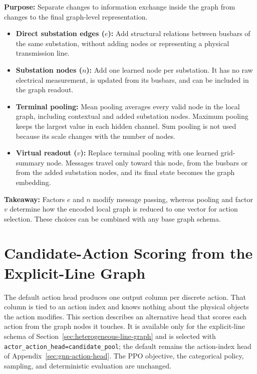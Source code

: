\begin{tcolorbox}[
  colframe=red!75!black,
  colback=red!5!white,
  title=Chapter Summary (2/3): Augmentations and Graph Readout
]
\textbf{Purpose:} Separate changes to information exchange inside the graph
from changes to the final graph-level representation.

\begin{itemize}
  \item \textbf{Direct substation edges ($e$):} Add structural relations between
  busbars of the same substation, without adding nodes or representing a
  physical transmission line.
  \item \textbf{Substation nodes ($n$):} Add one learned node per substation.
  It has no raw electrical measurement, is updated from its busbars, and can be
  included in the graph readout.
  \item \textbf{Terminal pooling:} Mean pooling averages every valid node in the
  local graph, including contextual and added substation nodes. Maximum pooling
  keeps the largest value in each hidden channel. Sum pooling is not used
  because its scale changes with the number of nodes.
  \item \textbf{Virtual readout ($v$):} Replace terminal pooling with one learned
  grid-summary node. Messages travel only toward this node, from the busbars or
  from the added substation nodes, and its final state becomes the graph
  embedding.
\end{itemize}

\textbf{Takeaway:} Factors $e$ and $n$ modify message passing, whereas pooling
and factor $v$ determine how the encoded local graph is reduced to one vector
for action selection. These choices can be combined with any base graph schema.
\end{tcolorbox}

\section{Candidate-Action Scoring from the Explicit-Line Graph}
\label{sec:candidate-action-scoring}

The default action head produces one output column per discrete action. That
column is tied to an action index and knows nothing about the physical objects
the action modifies. This section describes an alternative head that scores each
action from the graph nodes it touches. It is available only for the
explicit-line schema of Section~\ref{sec:heterogeneous-line-graph} and is
selected with \texttt{actor\_action\_head=candidate\_pool}; the default remains
the action-index head of Appendix~\ref{sec:gnn-action-head}. The PPO objective,
the categorical policy, sampling, and deterministic evaluation are unchanged.


